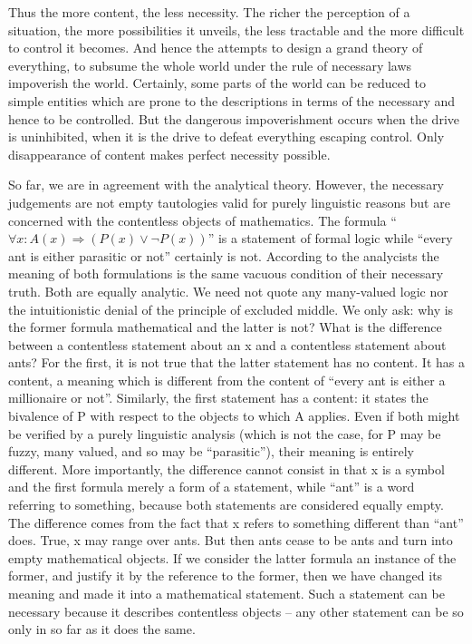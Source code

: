 Thus the more content, the less necessity. The richer the perception of a situation, the more possibilities it unveils, the less tractable and the more difficult to control it becomes. And hence the attempts to design a grand theory of everything, to subsume the whole world under the rule of necessary laws impoverish the world. Certainly, some parts of the world can be reduced to simple entities which are prone to the descriptions in terms of the necessary and hence to be controlled. But the dangerous impoverishment occurs when the drive is uninhibited, when it is the drive to defeat everything escaping control. Only disappearance of content makes perfect necessity possible. 

So far, we are in agreement with the analytical theory. However, the necessary judgements are not empty tautologies valid for purely linguistic reasons but are concerned with the contentless objects of mathematics. The formula 
``$\forall x: A(x) \Rightarrow (P(x) \lor \neg P(x))$'' 
is a statement of formal logic while ``every ant is either parasitic or not'' certainly is not. According to the analycists the meaning of both formulations is the same vacuous condition of their necessary truth. Both are equally analytic. We need not quote any many-valued logic nor the intuitionistic denial of the principle of excluded middle. We only ask: why is the former formula mathematical and the latter is not? What is the difference between a contentless statement about an x and a contentless statement about ants? For the first, it is not true that the latter statement has no content. It has a content, a meaning which is different from the content of ``every ant is either a millionaire or not''. Similarly, the first statement has a content: it states the bivalence of P with respect to the objects to which A applies. Even if both might be verified by a purely linguistic analysis (which is not the case, for P may be fuzzy, many valued, and so may be ``parasitic''), their meaning is entirely different. More importantly, the difference cannot consist in that x is a symbol and the first formula merely a form of a statement, while ``ant'' is a word referring to something, because both statements are considered equally empty. The difference comes from the fact that x refers to something different than ``ant'' does. True, x may range over ants. But then ants cease to be ants and turn into empty mathematical objects. If we consider the latter formula an instance of the former, and justify it by the reference to the former, then we have changed its meaning and made it into a mathematical statement. Such a statement can be necessary because it describes contentless objects -- any other statement can be so only in so far as it does the same.

